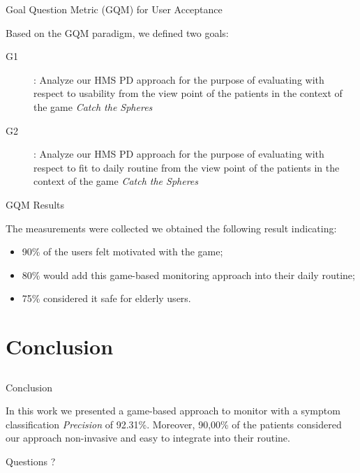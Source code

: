 \documentclass{beamer}
\begin{document}
\begin{frame}{Goal Question Metric (GQM) for User Acceptance}
	\begin{block}{}
	Based on the GQM paradigm, we defined two goals:
		\begin{description}
			\item [G1]: Analyze our HMS PD approach for the purpose of evaluating with respect to usability from the view point of the patients in the context of the game \emph{Catch the Spheres}
			\item [G2]: Analyze our HMS PD approach for the purpose of evaluating with respect to fit to daily routine from the view point of the patients in the context of the game \emph{Catch the Spheres}
		\end{description}
	\end{block}
\end{frame}


\begin{frame}{GQM Results}
	\begin{block}{}
	The measurements were collected we obtained the following result indicating:
		\begin{itemize}
			\item 90\% of the users felt motivated with the game;
			\item 80\% would add this game-based monitoring approach into their daily routine; 
			\item 75\% considered it safe for elderly users.
		\end{itemize}
	\end{block}
\end{frame}

\section{Conclusion}
\subsection{}
\begin{frame}{Conclusion}
	\begin{block}{}
	In this work we presented a game-based approach to monitor with a symptom classification \textit{Precision} of 92.31\%. Moreover, 90,00\% of the patients considered our approach non-invasive and easy to integrate into their routine. 
	\end{block}
\end{frame}

\begin{frame}
  \begin{center}
  Questions ?
  \end{center}
\end{frame}



\end{document}
